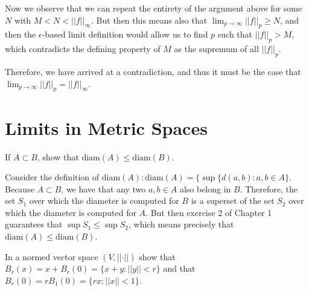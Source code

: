\begin{solution}
    Now we observe that we can repeat the entirety of the argument above for some $N$ with $M < N < \lvert \lvert f \rvert \rvert _{\infty}$.
    But then this means also that $\lim_{p \rightarrow \infty} \lvert \lvert f \rvert \rvert _p \geq N$, and then the $\epsilon$-based limit definition would allow us to find $p$ such that $\lvert \lvert f \rvert \rvert _p > M$, which contradicts the defining property of $M$ as the supremum of all $\lvert \lvert f \rvert \rvert _p$.

    Therefore, we have arrived at a contradiction, and thus it must be the case that $\lim_{p \rightarrow \infty} \lvert \lvert f \rvert \rvert _p = \lvert \lvert f \rvert \rvert _{\infty}$.

\end{solution}

\section{Limits in Metric Spaces}

\begin{exercise}{30}
    If $A \subset B$, show that $\text{diam}(A) \leq \text{diam}(B)$.
\end{exercise}

\begin{solution}
    
    Consider the definition of $\text{diam}(A): \text{diam}(A) = \{\sup\{d(a, b): a, b \in A\}$.
    Because $A \subset B$, we have that any two $a, b \in A$ also belong in $B$.
    Therefore, the set $S_1$ over which the diameter is computed for $B$ is a superset of the set $S_2$ over which the diameter is computed for $A$.
    But then exercise 2 of Chapter 1 guarantees that $\sup S_1 \leq \sup S_2$, which means precisely that $\text{diam}(A) \leq \text{diam}(B)$.
\end{solution}

\begin{exercise}{32}
    In a normed vector space $(V, \lvert \lvert \cdot \rvert \rvert)$ show that $B_r(x) = x + B_r(0) = \{x + y: \lvert \lvert y \rvert \rvert < r\}$ and that $B_r(0) = rB_1(0) = \{r x : \lvert \lvert x \rvert \rvert <1 \}$.
\end{exercise}

